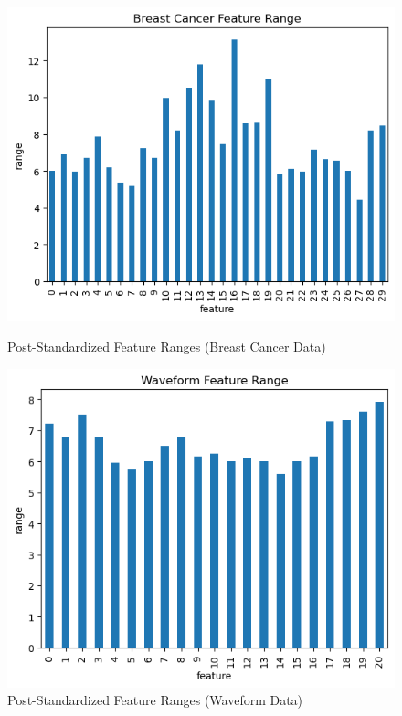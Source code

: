 \documentclass{article}
\begin{document}
\begin{figure}[H]
    \centering
    \begin{minipage}[b]{0.49\textwidth}
        \centering
        \includegraphics[width=\textwidth]{p_iii.png}
        \caption{Post-Standardized Feature Ranges (Breast Cancer Data)}
    \end{minipage}
    \hfill
    \begin{minipage}[b]{0.49\textwidth}
        \centering
        \includegraphics[width=\textwidth]{p_iv.png}
        \caption{Post-Standardized Feature Ranges (Waveform Data)}
    \end{minipage}
\end{figure}
\end{document}
